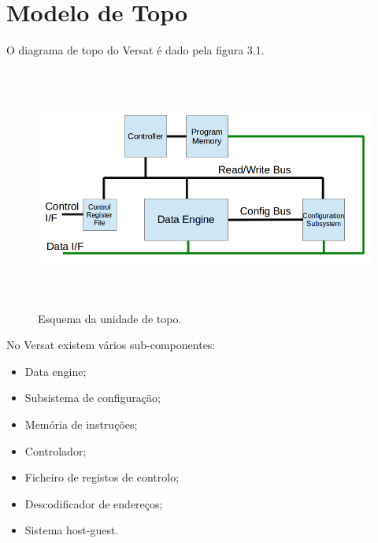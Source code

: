 \section{Modelo de Topo}
\label{section:Modelo de Topo}

O diagrama de topo do Versat é dado pela figura 3.1.

\begin{figure}[!htb]
  \centering
  \includegraphics[height=80mm, width=165mm]{Figures/top.png}
  \caption[Esquema da unidade de topo.]{Esquema da unidade de topo.}  
  \label{fig:Esquema_Unidade_Topo}
\end{figure}

No Versat existem vários sub-componentes:

\begin{itemize}
  \item Data engine;
  \item Subsistema de configuração;
  \item Memória de instruções;
  \item Controlador;
  \item Ficheiro de registos de controlo;
  \item Descodificador de endereços;
  \item Sistema host-guest. 
\end{itemize}

